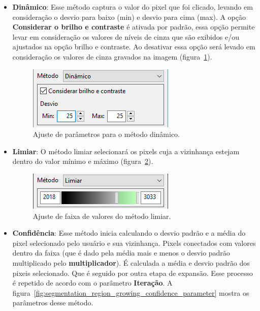 \begin{itemize}
	\item \textbf{Dinâmico}: Esse método captura o valor do pixel que foi clicado, levando em consideração o desvio para baixo (min) e desvio para cima (max). A opção \textbf{Considerar o brilho e contraste} é ativada por padrão, essa opção permite levar em consideração os valores de níveis de cinza que são exibidos e/ou ajustados na opção brilho e contraste. Ao desativar essa opção será levado em consideração os valores de cinza gravados na imagem (figura~\ref{fig:segmentation_region_growing_dinamic_parameter}). 
	
	\begin{figure}[!htb]
	\centering
	\includegraphics[scale=0.7]{../user_guide_figures/invesalius_screen/segmentation_region_growing_dinamic_parameter_pt.png}
	\caption{Ajuste de parâmetros para o método dinâmico.}
	\label{fig:segmentation_region_growing_dinamic_parameter}
	\end{figure}
	
	\item \textbf{Limiar}: O método limiar selecionará os pixels cuja a vizinhança estejam dentro do valor mínimo e máximo (figura~\ref{fig:segmentation_region_growing_limiar}).

	\begin{figure}[!htb]
	\centering
	\includegraphics[scale=0.7]{../user_guide_figures/invesalius_screen/segmentation_region_growing_limiar_pt.png}
	\caption{Ajuste de faixa de valores do método limiar.}
	\label{fig:segmentation_region_growing_limiar}
	\end{figure}	
	
\item \textbf{Confidência}: Esse método inicia calculando o desvio padrão e a média do pixel selecionado pelo usuário e sua vizinhança. Pixels conectados com valores dentro da faixa (que é dado pela média mais e menos o desvio padrão multiplicado pelo \textbf{multiplicador}). É calculada a média e desvio padrão dos pixeis selecionado. Que é seguido por outra etapa de expansão. Esse processo é repetido de acordo com o parâmetro \textbf{Iteração}. A figura~\ref{fig:segmentation_region_growing_confidence_parameter} mostra os parâmetros desse método.
	

\end{itemize}
